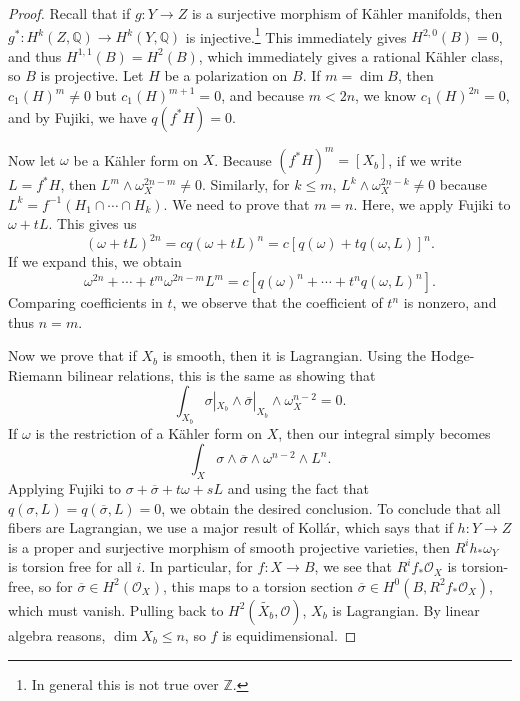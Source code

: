 \documentclass[leqno, openany]{memoir}
\theoremstyle{definition}
\theoremstyle{remark}
\theoremstyle{plain}
\theoremstyle{definition}
\theoremstyle{remark}
\newcommand{\Z}{\mathbb{Z}}
\newcommand{\Q}{\mathbb{Q}}
\newcommand{\mc}[1]{\mathcal{#1}}
\newcommand{\ol}[1]{\overline{#1}}
\newcommand{\wt}[1]{\widetilde{#1}}
\begin{document}
\begin{proof}
    Recall that if $g \colon Y \to Z$ is a surjective morphism of K\"ahler manifolds, then $g^* \colon H^k(Z, \Q) \to H^k(Y, \Q)$ is injective.\footnote{In general this is not true over $\Z$.} This immediately gives $H^{2,0}(B) = 0$, and thus $H^{1,1}(B) = H^2(B)$, which immediately gives a rational K\"ahler class, so $B$ is projective. Let $H$ be a polarization on $B$. If $m = \dim B$, then ${c_1(H)}^m \neq 0$ but ${c_1(H)}^{m+1} = 0$, and because $m < 2n$, we know ${c_1(H)}^{2n} = 0$, and by Fujiki, we have $q(f^* H) = 0$.

    Now let $\omega$ be a K\"ahler form on $X$. Because ${(f^*H)}^m = [X_b]$, if we write $L = f^* H$, then $L^m \wedge \omega_X^{2n-m} \neq 0$. Similarly, for $k \leq m$, $L^k \wedge \omega_X^{2n-k} \neq 0$ because $L^k = f^{-1}(H_1 \cap \cdots \cap H_k)$. We need to prove that $m = n$. Here, we apply Fujiki to $\omega + t L$. This gives us 
    \[ {(\omega + tL)}^{2n} = c {q(\omega + tL)}^n = c {[q(\omega) + t q(\omega, L)]}^n. \]
    If we expand this, we obtain
    \[ \omega^{2n} + \cdots + t^m \omega^{2n-m} L^m = c [{q(\omega)}^n + \cdots + t^n {q(\omega, L)}^n]. \]
    Comparing coefficients in $t$, we observe that the coefficient of $t^n$ is nonzero, and thus $n = m$.

    Now we prove that if $X_b$ is smooth, then it is Lagrangian. Using the Hodge-Riemann bilinear relations, this is the same as showing that
    \[ \int_{X_b} \sigma |_{X_b} \wedge \ol{\sigma} |_{X_b} \wedge \omega_{X}^{n-2} = 0. \]
    If $\omega$ is the restriction of a K\"ahler form on $X$, then our integral simply becomes
    \[ \int_X \sigma \wedge \ol{\sigma} \wedge \omega^{n-2} \wedge L^n. \]
    Applying Fujiki to $\sigma + \ol{\sigma} + t \omega + s L$ and using the fact that $q(\sigma, L) = q(\ol{\sigma}, L) = 0$, we obtain the desired conclusion. To conclude that all fibers are Lagrangian, we use a major result of Koll\'ar, which says that if $h \colon Y \to Z$ is a proper and surjective morphism of smooth projective varieties, then $R^i h_* \omega_Y$ is torsion free for all $i$. In particular, for $f \colon X \to B$, we see that $R^i f_* \mc{O}_X$ is torsion-free, so for $\ol{\sigma} \in H^2(\mc{O}_X)$, this maps to a torsion section $\ol{\sigma} \in H^0(B, R^2 f_* \mc{O}_X)$, which must vanish. Pulling back to $H^2(\wt{X_b}, \mc{O})$, $X_b$ is Lagrangian. By linear algebra reasons, $\dim X_b \leq n$, so $f$ is equidimensional.


\end{proof}
\end{document}
